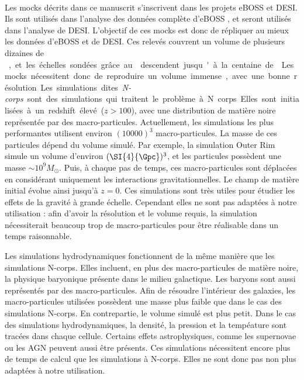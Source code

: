 \paragraph{}
Les mocks décrits dans ce manuscrit s'inscrivent dans les projets eBOSS et DESI. Ils sont utilisés dans l'analyse \lya{} des données complète d'eBOSS \autocite{DuMasdesBourboux2020}, et seront utilisés dans l'analyse \lya{} de DESI.
L'objectif de ces mocks est donc de répliquer au mieux les données \lya{} d'eBOSS et de DESI. Ces relevés couvrent un volume de plusieurs dizaines de \si{\cubic\Gpc}, et les échelles sondées grâce au \lya{} descendent jusqu'à la centaine de \si{\kpc}. Les mocks nécessitent donc de reproduire un volume immense, avec une bonne résolution.
Les simulations dites \emph{N-corps} sont des simulations qui traitent le problème à N corps.
Elles sont initialisées à un redshift élevé ($z > \num{100}$), avec une distribution de matière noire représentée par des macro-particules.
Actuellement, les simulations les plus performantes utilisent environ $(\num{10000})^3$ macro-particules.
La masse de ces particules dépend du volume simulé. Par exemple, la simulation Outer Rim \autocite{Heitmann2019} simule un volume d'environ $(\SI{4}{\Gpc})^3$, et les particules possèdent une masse $\sim 10^{9} M_{\odot}$.
Puis, à chaque pas de temps, ces macro-particules sont déplacées en considérant uniquement les interactions gravitationnelles. Le champ de matière initial évolue ainsi jusqu'à $z=0$. Ces simulations sont très utiles pour étudier les effets de la gravité à grande échelle. Cependant elles ne sont pas adaptées à notre utilisation : afin d'avoir la résolution et le volume requis, la simulation nécessiterait beaucoup trop de macro-particules pour être réalisable dans un temps raisonnable.

Les simulations hydrodynamiques fonctionnent de la même manière que les simulations N-corps. Elles incluent, en plus des macro-particules de matière noire, la physique baryonique présente dans le milieu galactique. Les baryons sont aussi représentés par des macro-particules. Afin de résoudre l'intérieur des galaxies, les macro-particules utilisées possèdent une masse plus faible que dans le cas des simulations N-corps. En contrepartie, le volume simulé est plus petit. Dans le cas des simulations hydrodynamiques, la densité, la pression et la tempéature sont tracées dans chaque cellule. Certains effets astrophysiques, comme les supernovae ou les AGN peuvent aussi être présents. 
Ces simulations nécessitent encore plus de temps de calcul que les simulations à N-corps. Elles ne sont donc pas non plus adaptées à notre utilisation.


